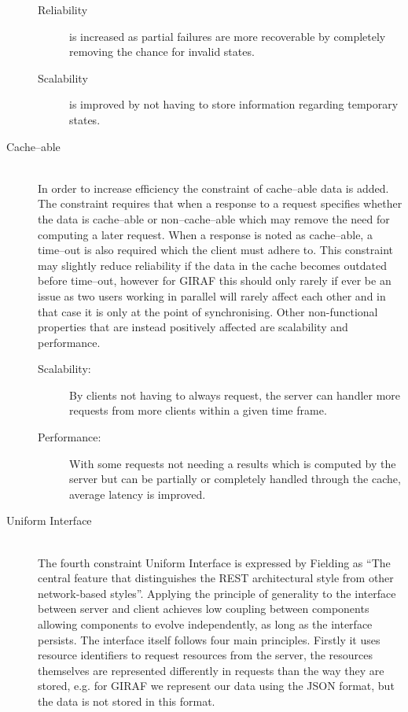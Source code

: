\begin{description}
\begin{description}
        \item[Reliability] is increased as partial failures are more recoverable by completely removing the chance for invalid states.
        \item[Scalability] is improved by not having to store information regarding temporary states.
    \end{description}
    \item [Cache--able] \hfill \\
    In order to increase efficiency the constraint of cache--able data is added.
    The constraint requires that when a response to a request specifies whether the data is cache--able or non--cache--able which may remove the need for computing a later request.
    When a response is noted as cache--able, a time--out is also required which the client must adhere to.
    This constraint may slightly reduce reliability if the data in the cache becomes outdated before time--out, however for GIRAF this should only rarely if ever be an issue as two users working in parallel will rarely affect each other and in that case it is only at the point of synchronising.
    Other non-functional properties that are instead positively affected are scalability and performance.
    \begin{description}
        \item[Scalability:] By clients not having to always request, the server can handler more requests from more clients within a given time frame.
        \item[Performance:] With some requests not needing a results which is computed by the server but can be partially or completely handled through the cache, average latency is improved.
    \end{description}
    \item [Uniform Interface] \hfill \\
    The fourth constraint Uniform Interface is expressed by Fielding as \enquote{The central feature that distinguishes the REST architectural style from other network-based styles}\citep{fielding2000rest}.
    Applying the principle of generality to the interface between server and client achieves low coupling between components allowing components to evolve independently, as long as the interface persists.
    The interface itself follows four main principles.
    Firstly it uses resource identifiers to request resources from the server, the resources themselves are represented differently in requests than the way they are stored, e.g. for GIRAF we represent our data using the JSON format, but the data is not stored in this format.

\end{description}
